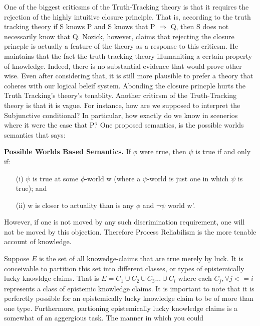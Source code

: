\documentclass{article}
\begin{document}

One of the biggest criticsms of the Truth-Tracking theory is that it requires
the rejection of the highly intuitive closure principle. That is, according
to the truth tracking theory if S knows P and S  knows that  P $\Rightarrow$ Q,
then S does not necessarily know that Q. Nozick, however, claims that rejecting
the closure princple is actually a feature of the theory as a response to this
criticsm. He maintains that the fact the truth tracking theory illumaniting a
certain property of knowledge. Indeed, there is no substantial evidence that would
prove other wise. Even after considering that, it is still more plausible
to prefer a theory that coheres with our logical beleif system. Abonding the
closure princple hurts the Truth Tracking's theory's tenablity. Another criticsm
of the Truth-Tracking theory is that it is vague. For instance, how are we
supposed to interpret the Subjunctive conditional? In particular, how exactly
do we know in scenerios where it were the case that P? One proposed semantics, is
the possible worlds semantics that says:
\begin{displayquote}
  \textbf{Possible Worlds Based Semantics.}
  If $\phi$ were true, then $\psi$ is true if and only if:
  \begin{enumerate}
    \item[(i)] $\psi$ is true at some $\phi$-world w
    (where a $\psi$-world is just one in which $\psi$ is true); and
    \item[(ii)] w is closer to actuality than is any $\phi$ and $\neg \psi$
    world w'.
  \end{enumerate}
\end{displayquote}

However, if one is not moved by any such discrimination requirement,
one will not be moved by this objection. Therefore Process Reliabilism
is the more tenable account of knowledge.



Suppose $E$ is the set of all knowedge-claims that are true merely by luck.
It is conceivable to partition this set into different classes, or types
of epistemically lucky knowldge claims. That is $E = C_{1} \cup C_{2} \cup
C_{3} ... \cup C_{i}$ where each $C_{j}, \forall j <= i$ represents a class
of epistemic knowledge claims. It is important to note that it is perferctly
possible for an epistemically lucky knowledge claim to be of more than one type.
Furthermore, partioning epistemically lucky knowledge claims is a somewhat of an
aggergious task. The manner in which you could
\end{document}
